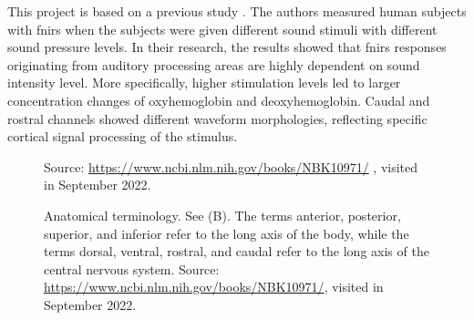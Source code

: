 This project is based on a previous study \citep{Weder2018}. The authors measured human subjects with  \acrshort{fnirs} when the subjects were given different sound stimuli with different sound pressure levels. In their research, the results showed that  \acrshort{fnirs} responses originating from auditory processing areas are highly dependent on sound intensity level. More specifically, higher stimulation levels led to larger concentration changes of oxyhemoglobin and deoxyhemoglobin. Caudal and rostral channels showed different waveform morphologies, reflecting specific cortical signal processing of the stimulus. 

\begin{figure}[h]
  \centering
           {Source: \url{https://www.ncbi.nlm.nih.gov/books/NBK10971/} , visited in September 2022.}
   
  \caption{Anatomical terminology. See (B). The terms anterior, posterior, superior, and inferior refer to the long axis of the body, while the terms dorsal, ventral, rostral, and caudal refer to the long axis of the central nervous system. Source: \url{https://www.ncbi.nlm.nih.gov/books/NBK10971/}, visited in September 2022.}
\end{figure}



